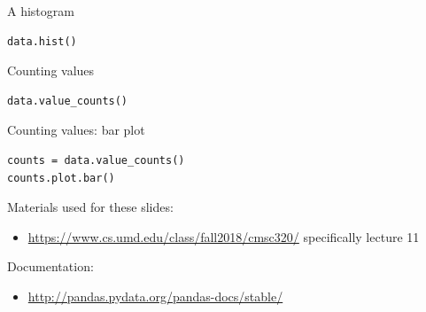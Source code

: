 \documentclass{beamer}
\begin{document}
\begin{frame}[fragile]{A histogram}
\begin{lstlisting}
data.hist()
\end{lstlisting}
\end{frame}

\begin{frame}[fragile]{Counting values}
\begin{lstlisting}
data.value_counts()
\end{lstlisting}
\end{frame}

\begin{frame}[fragile]{Counting values: bar plot}
\begin{lstlisting}
counts = data.value_counts()
counts.plot.bar()
\end{lstlisting}
\end{frame}




\begin{frame}
Materials used for these slides:
\begin{itemize}
\item \url{https://www.cs.umd.edu/class/fall2018/cmsc320/}
    specifically lecture 11
\end{itemize}

\vspace{1em}
Documentation:
\begin{itemize}
    \item \url{http://pandas.pydata.org/pandas-docs/stable/}
\end{itemize}
\end{frame}
\end{document}
